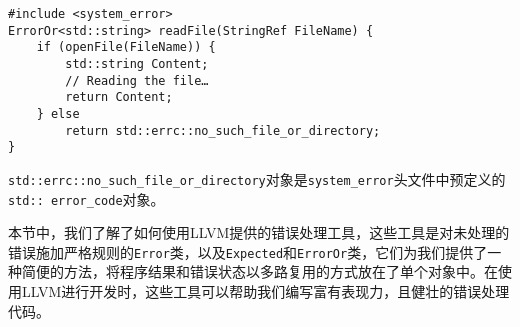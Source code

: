 \begin{lstlisting}[style=styleCXX]
#include <system_error>
ErrorOr<std::string> readFile(StringRef FileName) {
	if (openFile(FileName)) {
		std::string Content;
		// Reading the file…
		return Content;
	} else
		return std::errc::no_such_file_or_directory;
}
\end{lstlisting}

\texttt{std::errc::no\_such\_file\_or\_directory}对象是\texttt{system\_error}头文件中预定义的\texttt{std:: error\_code}对象。

本节中，我们了解了如何使用LLVM提供的错误处理工具，这些工具是对未处理的错误施加严格规则的\texttt{Error}类，以及\texttt{Expected}和\texttt{ErrorOr}类，它们为我们提供了一种简便的方法，将程序结果和错误状态以多路复用的方式放在了单个对象中。在使用LLVM进行开发时，这些工具可以帮助我们编写富有表现力，且健壮的错误处理代码。







